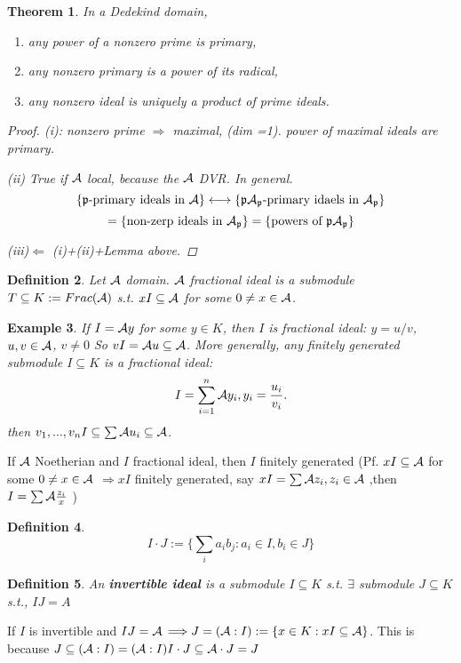 \documentclass[11pt]{article}
\newtheorem{thm}{Theorem}[section]
\newtheorem{dfn}[thm]{Definition}
\newtheorem{ex}[thm]{Example}
\newcommand{\scp}{{\mathfrak p}}
\newcommand{\cala}{{\cal A}}
\newcommand{\Lrta}{\Longrightarrow}
\newcommand{\llrta}{\longleftrightarrow}
\newcommand{\Llta}{\Longleftarrow}
\begin{document}
\begin{thm}
In a Dedekind domain, 
\begin{enumerate}[label=(\roman*)]
\item any power of a nonzero prime is primary,
\item any nonzero primary  is a power of its radical,
\item any nonzero ideal is uniquely a product of prime ideals.
\end{enumerate}
\begin{proof}
(i): nonzero prime $\Lrta$ maximal, (dim =1). power of maximal ideals are primary.

(ii) True if $\cala$ local, because the $\cala$ DVR. In general.
$$
\{\scp\text{-primary ideals in }\cala\}\llrta \{\scp\cala_\scp\text{-primary idaels in }\cala_\scp\}
$$
$$
=\{\text{non-zerp ideals in $\cala_\scp$}\}=\{\text{powers of $\scp\cala_\scp$}\}
$$

(iii)$\Llta$ (i)+(ii)+Lemma above. 
\end{proof}
\end{thm}

\begin{dfn}
Let $\cala$ domain. $\cala$ fractional ideal is a submodule $T\subseteq K:=Frac(\cala)$ s.t. $x I\subseteq \cala$ for some $0\neq x\in\cala$.
\end{dfn}
\begin{ex}
If $I=\cala y$ for some $y\in K$, then $I$ is fractional ideal: $y=u/v$, $u,v\in\cala$, $v\neq 0$
So $v I=\cala u\subseteq \cala$. More generally, any finitely generated submodule $I\subseteq K$ is a fractional ideal:
$$
I=\sum_{i=1}^n\cala y_i, y_i=\frac{u_i}{v_i}.
$$
then $v_1,...,v_n I\subseteq \sum\cala u_i\subseteq \cala$.
\end{ex}
If $\cala$ Noetherian and $I$ fractional ideal, then $I $ finitely generated 
(Pf. $x I\subseteq \cala$ for some $0\neq x\in \cala$ $\Lrta xI$ finitely generated, say $xI =\sum\cala z_i,z_i\in \cala$ ,then $I=\sum\cala \frac{z_i}{x}$
)

\begin{dfn}
$$
I\cdot J:=\{\sum_i a_i b_j: a_i \in I, b_i\in J\}
$$
\end{dfn}

\begin{dfn}
An \textbf{invertible ideal} is a submodule $I\subseteq K$ s.t. $\exists$ submodule $J\subseteq K$ s.t., $IJ=A$
\end{dfn}

If $I$ is invertible and $IJ=\cala$ $\Lrta J=(\cala: I):=\{x\in K: xI \subseteq \cala\}$. This is because 
$J\subseteq (\cala:I)=(\cala:I) I\cdot J\subseteq \cala\cdot J=J$
\end{document}
